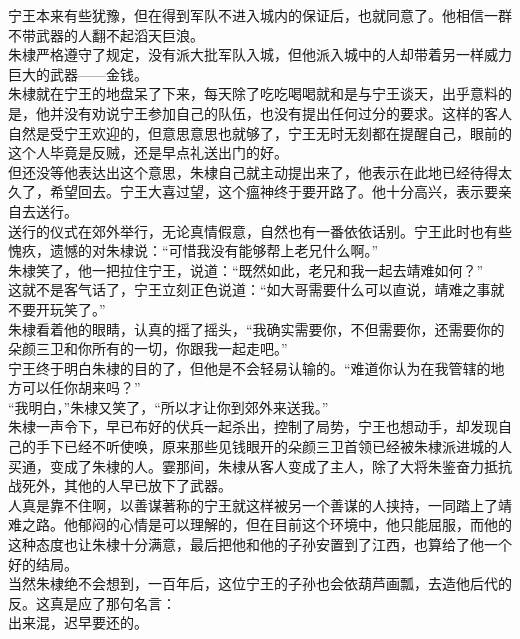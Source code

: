 \begin{multicols}{\theparacolNo}
宁王本来有些犹豫，但在得到军队不进入城内的保证后，也就同意了。他相信一群不带武器的人翻不起滔天巨浪。\\

朱棣严格遵守了规定，没有派大批军队入城，但他派入城中的人却带着另一样威力巨大的武器——金钱。\\

朱棣就在宁王的地盘呆了下来，每天除了吃吃喝喝就和是与宁王谈天，出乎意料的是，他并没有劝说宁王参加自己的队伍，也没有提出任何过分的要求。这样的客人自然是受宁王欢迎的，但意思意思也就够了，宁王无时无刻都在提醒自己，眼前的这个人毕竟是反贼，还是早点礼送出门的好。\\

但还没等他表达出这个意思，朱棣自己就主动提出来了，他表示在此地已经待得太久了，希望回去。宁王大喜过望，这个瘟神终于要开路了。他十分高兴，表示要亲自去送行。\\

送行的仪式在郊外举行，无论真情假意，自然也有一番依依话别。宁王此时也有些愧疚，遗憾的对朱棣说：“可惜我没有能够帮上老兄什么啊。”\\

朱棣笑了，他一把拉住宁王，说道：“既然如此，老兄和我一起去靖难如何？”\\

这就不是客气话了，宁王立刻正色说道：“如大哥需要什么可以直说，靖难之事就不要开玩笑了。”\\

朱棣看着他的眼睛，认真的摇了摇头，“我确实需要你，不但需要你，还需要你的朵颜三卫和你所有的一切，你跟我一起走吧。”\\

宁王终于明白朱棣的目的了，但他是不会轻易认输的。“难道你认为在我管辖的地方可以任你胡来吗？”\\

“我明白，”朱棣又笑了，“所以才让你到郊外来送我。”\\

朱棣一声令下，早已布好的伏兵一起杀出，控制了局势，宁王也想动手，却发现自己的手下已经不听使唤，原来那些见钱眼开的朵颜三卫首领已经被朱棣派进城的人买通，变成了朱棣的人。霎那间，朱棣从客人变成了主人，除了大将朱鉴奋力抵抗战死外，其他的人早已放下了武器。\\

人真是靠不住啊，以善谋著称的宁王就这样被另一个善谋的人挟持，一同踏上了靖难之路。他郁闷的心情是可以理解的，但在目前这个环境中，他只能屈服，而他的这种态度也让朱棣十分满意，最后把他和他的子孙安置到了江西，也算给了他一个好的结局。\\

当然朱棣绝不会想到，一百年后，这位宁王的子孙也会依葫芦画瓢，去造他后代的反。这真是应了那句名言：\\

出来混，迟早要还的。\\
\ifnum{}
	\end{multicols}
\fi
\newpage
